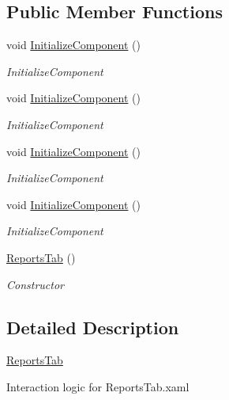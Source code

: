 \subsection*{Public Member Functions}
\begin{DoxyCompactItemize}
\item 
void \hyperlink{class_baudi_1_1_client_1_1_view_1_1_tabs_1_1_reports_tab_a9317b0e72327aba57b88f164a680c065}{Initialize\+Component} ()
\begin{DoxyCompactList}\small\item\em Initialize\+Component \end{DoxyCompactList}\item 
void \hyperlink{class_baudi_1_1_client_1_1_view_1_1_tabs_1_1_reports_tab_a9317b0e72327aba57b88f164a680c065}{Initialize\+Component} ()
\begin{DoxyCompactList}\small\item\em Initialize\+Component \end{DoxyCompactList}\item 
void \hyperlink{class_baudi_1_1_client_1_1_view_1_1_tabs_1_1_reports_tab_a9317b0e72327aba57b88f164a680c065}{Initialize\+Component} ()
\begin{DoxyCompactList}\small\item\em Initialize\+Component \end{DoxyCompactList}\item 
void \hyperlink{class_baudi_1_1_client_1_1_view_1_1_tabs_1_1_reports_tab_a9317b0e72327aba57b88f164a680c065}{Initialize\+Component} ()
\begin{DoxyCompactList}\small\item\em Initialize\+Component \end{DoxyCompactList}\item 
\hyperlink{class_baudi_1_1_client_1_1_view_1_1_tabs_1_1_reports_tab_a9568c51c074d3ae96f471c2de9da8e3e}{Reports\+Tab} ()
\begin{DoxyCompactList}\small\item\em Constructor \end{DoxyCompactList}\end{DoxyCompactItemize}


\subsection{Detailed Description}
\hyperlink{class_baudi_1_1_client_1_1_view_1_1_tabs_1_1_reports_tab}{Reports\+Tab} 

Interaction logic for Reports\+Tab.\+xaml 

